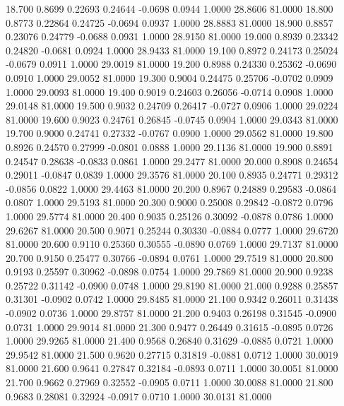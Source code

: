   18.700   0.8699   0.22693   0.24644  -0.0698   0.0944   1.0000  28.8606  81.0000
  18.800   0.8773   0.22864   0.24725  -0.0694   0.0937   1.0000  28.8883  81.0000
  18.900   0.8857   0.23076   0.24779  -0.0688   0.0931   1.0000  28.9150  81.0000
  19.000   0.8939   0.23342   0.24820  -0.0681   0.0924   1.0000  28.9433  81.0000
  19.100   0.8972   0.24173   0.25024  -0.0679   0.0911   1.0000  29.0019  81.0000
  19.200   0.8988   0.24330   0.25362  -0.0690   0.0910   1.0000  29.0052  81.0000
  19.300   0.9004   0.24475   0.25706  -0.0702   0.0909   1.0000  29.0093  81.0000
  19.400   0.9019   0.24603   0.26056  -0.0714   0.0908   1.0000  29.0148  81.0000
  19.500   0.9032   0.24709   0.26417  -0.0727   0.0906   1.0000  29.0224  81.0000
  19.600   0.9023   0.24761   0.26845  -0.0745   0.0904   1.0000  29.0343  81.0000
  19.700   0.9000   0.24741   0.27332  -0.0767   0.0900   1.0000  29.0562  81.0000
  19.800   0.8926   0.24570   0.27999  -0.0801   0.0888   1.0000  29.1136  81.0000
  19.900   0.8891   0.24547   0.28638  -0.0833   0.0861   1.0000  29.2477  81.0000
  20.000   0.8908   0.24654   0.29011  -0.0847   0.0839   1.0000  29.3576  81.0000
  20.100   0.8935   0.24771   0.29312  -0.0856   0.0822   1.0000  29.4463  81.0000
  20.200   0.8967   0.24889   0.29583  -0.0864   0.0807   1.0000  29.5193  81.0000
  20.300   0.9000   0.25008   0.29842  -0.0872   0.0796   1.0000  29.5774  81.0000
  20.400   0.9035   0.25126   0.30092  -0.0878   0.0786   1.0000  29.6267  81.0000
  20.500   0.9071   0.25244   0.30330  -0.0884   0.0777   1.0000  29.6720  81.0000
  20.600   0.9110   0.25360   0.30555  -0.0890   0.0769   1.0000  29.7137  81.0000
  20.700   0.9150   0.25477   0.30766  -0.0894   0.0761   1.0000  29.7519  81.0000
  20.800   0.9193   0.25597   0.30962  -0.0898   0.0754   1.0000  29.7869  81.0000
  20.900   0.9238   0.25722   0.31142  -0.0900   0.0748   1.0000  29.8190  81.0000
  21.000   0.9288   0.25857   0.31301  -0.0902   0.0742   1.0000  29.8485  81.0000
  21.100   0.9342   0.26011   0.31438  -0.0902   0.0736   1.0000  29.8757  81.0000
  21.200   0.9403   0.26198   0.31545  -0.0900   0.0731   1.0000  29.9014  81.0000
  21.300   0.9477   0.26449   0.31615  -0.0895   0.0726   1.0000  29.9265  81.0000
  21.400   0.9568   0.26840   0.31629  -0.0885   0.0721   1.0000  29.9542  81.0000
  21.500   0.9620   0.27715   0.31819  -0.0881   0.0712   1.0000  30.0019  81.0000
  21.600   0.9641   0.27847   0.32184  -0.0893   0.0711   1.0000  30.0051  81.0000
  21.700   0.9662   0.27969   0.32552  -0.0905   0.0711   1.0000  30.0088  81.0000
  21.800   0.9683   0.28081   0.32924  -0.0917   0.0710   1.0000  30.0131  81.0000
